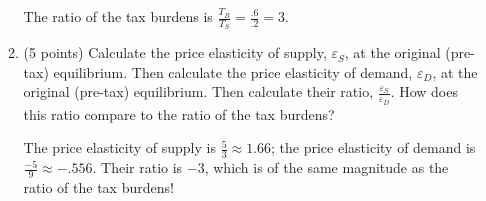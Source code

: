 \documentclass{article}
\newcommand{\myitem}{\item (5 points)\ }
\begin{document}
\begin{enumerate}
\begin{enumerate}
\begin{KEY}
The ratio of the tax burdens is $\displaystyle \frac{T_B}{T_S} = \frac{.6}{.2}=3.$

\end{KEY}


    \item \begin{EXAM} (5 points) Calculate the price elasticity of supply, $\varepsilon_S$, at the original
(pre-tax) equilibrium. Then calculate the price elasticity of demand, $\varepsilon_D$, at the original (pre-tax) equilibrium. Then calculate their ratio, $\displaystyle \frac{\varepsilon_S}{\varepsilon_D}$. How does this ratio compare to the ratio of the tax burdens? \vspace{3.6in}  \end{EXAM}

\begin{KEY}

The price elasticity of supply is $\frac{5}{3}\approx 1.66$; the price elasticity of demand is $\frac{-5}{9}\approx -.556$. Their ratio is $-3$, which is of the same magnitude as the ratio of the tax burdens!


\end{KEY}







\end{enumerate}

















\end{enumerate}
\end{document}
